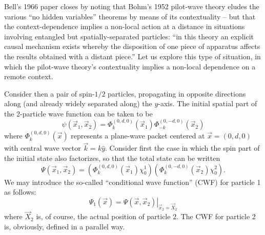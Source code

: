 \documentclass[aps,prc,onecolumn,letterpaper,floatfix,12pt]{revtex4}
\begin{document}




Bell's 1966 paper closes by noting that Bohm's 1952 pilot-wave
theory eludes the various ``no hidden variables'' theorems by means of
its contextuality -- but that the context-dependence implies a
non-local action at a distance in situations involving entangled but
spatially-separated 
particles:  ``in this theory an explicit causal mechanism exists
whereby the disposition of one piece of apparatus affects the results
obtained with a distant piece.''  \cite{bell66}  Let us explore this type of
situation, in which the pilot-wave theory's contextuality implies a
non-local dependence on a remote context. 

Consider then a pair of spin-$1/2$ particles, propagating in opposite
directions along (and already widely separated along) the $y$-axis.
The initial spatial part of the 2-particle wave function can be taken
to be
\begin{equation}
\psi(\vec{x}_1, \vec{x}_2) = \Phi^{(0,d,0)}_k (\vec{x}_1) \Phi^{(0,-d,0)}_{-k} (\vec{x}_2)
\end{equation}
where $\Phi^{(0,d,0)}_k(\vec{x})$ represents a plane-wave packet \cite{pwp}
centered at $\vec{x} = (0,d,0)$ with central wave vector
$\vec{k} = k \hat{y}$.  Consider first the case in which
the spin part of the initial state also factorizes, so that the total
state can be written
\begin{equation}
\Psi(\vec{x}_1,\vec{x}_2) = \left( \Phi^{(0,d,0)}_k (\vec{x}_1) \chi^1_0\right)
\left( \Phi^{(0,-d,0)}_k(\vec{x}_2) \chi^2_0 \right).
\label{factor}
\end{equation}
We may introduce the so-called ``conditional wave function'' (CWF)
for particle 1 as follows:
\begin{equation}
\Psi_1(\vec{x}) = \left. \Psi(\vec{x}, \vec{x}_2) \right|_{ \vec{x}_2
  = \vec{X}_2}
\end{equation}
where $\vec{X}_2$ is, of course, the actual position of particle 2.
The CWF for particle 2 is, obviously, defined in a parallel way.
\end{document}
